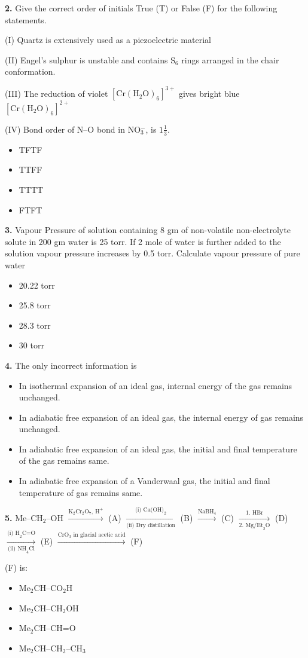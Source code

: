 \documentclass[10pt,twocolumn]{extarticle}
\newenvironment{qoptions}{\begin{itemize}[leftmargin=1.8em,itemsep=2pt,topsep=2pt,label={}]}{\end{itemize}}
\newcommand{\opt}[2]{\item[({#1})] {#2}}
\begin{document}
\textbf{2.} Give the correct order of initials True (T) or False (F) for the following statements.

(I) Quartz is extensively used as a piezoelectric material

(II) Engel's sulphur is unstable and contains S$_6$ rings arranged in the chair conformation.

(III) The reduction of violet $[\text{Cr}(\text{H}_2\text{O})_6]^{3+}$ gives bright blue $[\text{Cr}(\text{H}_2\text{O})_6]^{2+}$

(IV) Bond order of N--O bond in NO$_3^-$, is $1\tfrac13$.

\begin{qoptions}
\opt{A}{TFTF}
\opt{B}{TTFF}
\opt{C}{TTTT}
\opt{D}{FTFT}
\end{qoptions}

\textbf{3.} Vapour Pressure of solution containing 8 gm of non-volatile non-electrolyte solute in 200 gm water is 25 torr. If 2 mole of water is further added to the solution vapour pressure increases by 0.5 torr. Calculate vapour pressure of pure water

\begin{qoptions}
\opt{A}{20.22 torr}
\opt{B}{25.8 torr}
\opt{C}{28.3 torr}
\opt{D}{30 torr}
\end{qoptions}

\textbf{4.} The only incorrect information is

\begin{qoptions}
\opt{A}{In isothermal expansion of an ideal gas, internal energy of the gas remains unchanged.}
\opt{B}{In adiabatic free expansion of an ideal gas, the internal energy of gas remains unchanged.}
\opt{C}{In adiabatic free expansion of an ideal gas, the initial and final temperature of the gas remains same.}
\opt{D}{In adiabatic free expansion of a Vanderwaal gas, the initial and final temperature of gas remains same.}
\end{qoptions}

\textbf{5.} Me--CH$_2$--OH $\xrightarrow{\text{K}_2\text{Cr}_2\text{O}_7,\ \text{H}^+}$ (A) $\xrightarrow[\text{(ii) Dry distillation}]{\text{(i) Ca(OH)}_2}$ (B) $\xrightarrow{\text{NaBH}_4}$ (C) $\xrightarrow[\text{2. Mg/Et}_2\text{O}]{\text{1. HBr}}$ (D) $\xrightarrow[\text{(ii) NH}_4\text{Cl}]{\text{(i) H}_2\text{C=O}}$ (E) $\xrightarrow{\text{CrO}_3\text{ in glacial acetic acid}}$ (F)

(F) is:

\begin{qoptions}
\opt{A}{Me$_2$CH--CO$_2$H}
\opt{B}{Me$_2$CH--CH$_2$OH}
\opt{C}{Me$_2$CH--CH=O}
\opt{D}{Me$_2$CH--CH$_2$--CH$_3$}
\end{qoptions}
\end{document}
